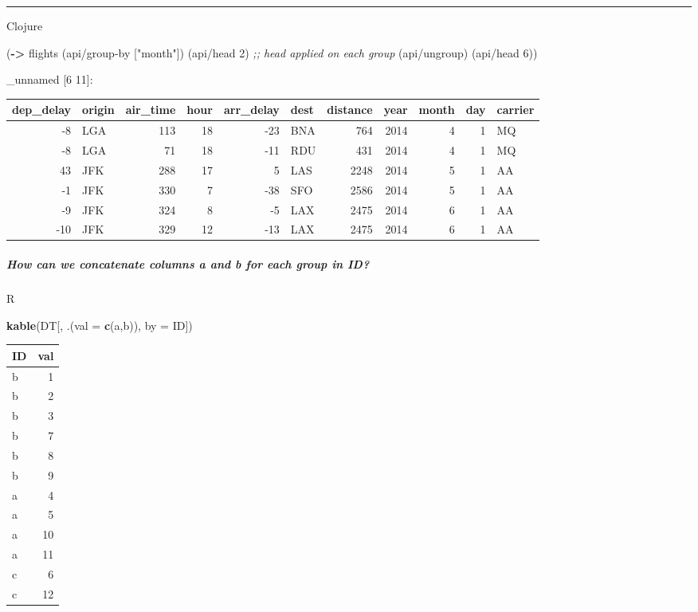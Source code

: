 \documentclass[]{article}
\newenvironment{Shaded}{\begin{snugshade}}{\end{snugshade}}
\newcommand{\KeywordTok}[1]{\textcolor[rgb]{0.13,0.29,0.53}{\textbf{#1}}}
\newcommand{\DataTypeTok}[1]{\textcolor[rgb]{0.13,0.29,0.53}{#1}}
\newcommand{\DecValTok}[1]{\textcolor[rgb]{0.00,0.00,0.81}{#1}}
\newcommand{\StringTok}[1]{\textcolor[rgb]{0.31,0.60,0.02}{#1}}
\newcommand{\CommentTok}[1]{\textcolor[rgb]{0.56,0.35,0.01}{\textit{#1}}}
\newcommand{\NormalTok}[1]{#1}
\let\oldsubparagraph\subparagraph
\renewcommand{\subparagraph}[1]{\oldsubparagraph{#1}\mbox{}}
\begin{document}
\begin{center}\rule{0.5\linewidth}{0.5pt}\end{center}

Clojure

\begin{Shaded}
\begin{Highlighting}[]
\NormalTok{(}\KeywordTok{->}\NormalTok{ flights}
\NormalTok{    (api/group-by [}\StringTok{"month"}\NormalTok{])}
\NormalTok{    (api/head }\DecValTok{2}\NormalTok{) }\CommentTok{;; head applied on each group}
\NormalTok{    (api/ungroup)}
\NormalTok{    (api/head }\DecValTok{6}\NormalTok{))}
\end{Highlighting}
\end{Shaded}

\_unnamed {[}6 11{]}:

\begin{longtable}[]{@{}rlrrrlrrrrl@{}}
\toprule
dep\_delay & origin & air\_time & hour & arr\_delay & dest & distance &
year & month & day & carrier\tabularnewline
\midrule
\endhead
-8 & LGA & 113 & 18 & -23 & BNA & 764 & 2014 & 4 & 1 & MQ\tabularnewline
-8 & LGA & 71 & 18 & -11 & RDU & 431 & 2014 & 4 & 1 & MQ\tabularnewline
43 & JFK & 288 & 17 & 5 & LAS & 2248 & 2014 & 5 & 1 & AA\tabularnewline
-1 & JFK & 330 & 7 & -38 & SFO & 2586 & 2014 & 5 & 1 & AA\tabularnewline
-9 & JFK & 324 & 8 & -5 & LAX & 2475 & 2014 & 6 & 1 & AA\tabularnewline
-10 & JFK & 329 & 12 & -13 & LAX & 2475 & 2014 & 6 & 1 &
AA\tabularnewline
\bottomrule
\end{longtable}

\subparagraph{How can we concatenate columns a and b for each group in
ID?}\label{how-can-we-concatenate-columns-a-and-b-for-each-group-in-id}

R

\begin{Shaded}
\begin{Highlighting}[]
\KeywordTok{kable}\NormalTok{(DT[, .(}\DataTypeTok{val =} \KeywordTok{c}\NormalTok{(a,b)), }\DataTypeTok{by =}\NormalTok{ ID])}
\end{Highlighting}
\end{Shaded}

\begin{longtable}[]{@{}lr@{}}
\toprule
ID & val\tabularnewline
\midrule
\endhead
b & 1\tabularnewline
b & 2\tabularnewline
b & 3\tabularnewline
b & 7\tabularnewline
b & 8\tabularnewline
b & 9\tabularnewline
a & 4\tabularnewline
a & 5\tabularnewline
a & 10\tabularnewline
a & 11\tabularnewline
c & 6\tabularnewline
c & 12\tabularnewline
\bottomrule
\end{longtable}
\end{document}
